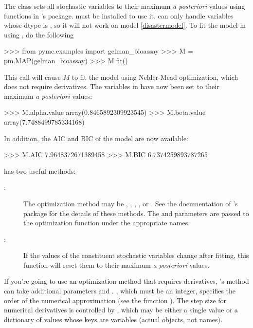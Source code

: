 \documentclass[]{jss}
\begin{document}
The  class sets all stochastic variables to their maximum \emph{a posteriori} values using functions in 's  package.  must be installed to use it.  can only handle variables whose dtype is , so it will not work on model \ref{disastermodel}. To fit the model in  using , do the following
\begin{CodeInput}
>>> from pymc.examples import gelman_bioassay
>>> M = pm.MAP(gelman_bioassay)
>>> M.fit()
\end{CodeInput}
This call will cause $M$ to fit the model using Nelder-Mead optimization, which does not require derivatives. The variables in  have now been set to their maximum \emph{a posteriori} values:
\begin{CodeInput}
>>> M.alpha.value
array(0.8465892309923545)
>>> M.beta.value
array(7.7488499785334168)
\end{CodeInput}
In addition, the AIC and BIC of the model are now available:
\begin{CodeInput}
>>> M.AIC
7.9648372671389458
>>> M.BIC
6.7374259893787265
\end{CodeInput}

\bigskip
{} has two useful methods:
\begin{description}
    \item[:] The optimization method may be , , , , or . See the documentation of 's  package for the details of these methods. The  and  parameters are passed to the optimization function under the appropriate names.
    \item[:] If the values of the constituent stochastic variables change after fitting, this function will reset them to their maximum \emph{a posteriori} values.
\end{description}
If you're going to use an optimization method that requires derivatives, 's  method can take additional parameters  and . , which must be an integer, specifies the order of the numerical approximation (see the  function ). The step size for numerical derivatives is controlled by , which may be either a single value or a dictionary of values whose keys are variables (actual objects, not names).
\end{document}
